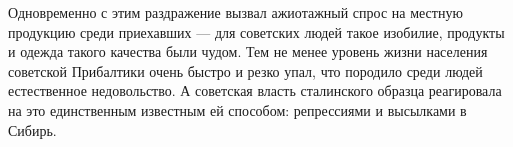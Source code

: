 Одновременно с этим раздражение вызвал ажиотажный спрос на местную продукцию
среди приехавших — для советских людей такое изобилие, продукты и одежда такого
качества были чудом. Тем не менее уровень жизни населения советской Прибалтики
очень быстро и резко упал, что породило среди людей естественное недовольство.
А советская власть сталинского образца реагировала на это единственным
известным ей способом: репрессиями и высылками в Сибирь.
